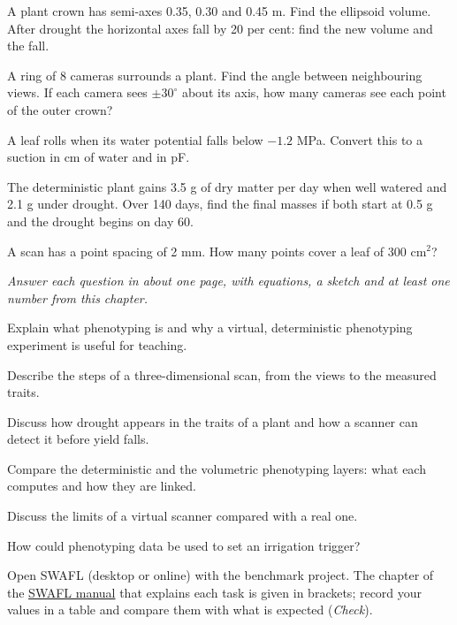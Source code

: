 \begin{exlist}
\item A plant crown has semi-axes 0.35, 0.30 and 0.45 m. Find the ellipsoid volume. After drought the horizontal axes fall by 20 per cent: find the new volume and the fall.
\item A ring of 8 cameras surrounds a plant. Find the angle between neighbouring views. If each camera sees $\pm30^\circ$ about its axis, how many cameras see each point of the outer crown?
\item A leaf rolls when its water potential falls below $-1.2$ MPa. Convert this to a suction in cm of water and in pF.
\item The deterministic plant gains 3.5 g of dry matter per day when well watered and 2.1 g under drought. Over 140 days, find the final masses if both start at 0.5 g and the drought begins on day 60.
\item A scan has a point spacing of 2 mm. How many points cover a leaf of 300 cm$^2$?
\end{exlist}
{\small\itshape Answer each question in about one page, with equations, a sketch and at least one number from this chapter.}\par\vspace{3pt}
\begin{exlist}
\item Explain what phenotyping is and why a virtual, deterministic phenotyping experiment is useful for teaching.
\item Describe the steps of a three-dimensional scan, from the views to the measured traits.
\item Discuss how drought appears in the traits of a plant and how a scanner can detect it before yield falls.
\item Compare the deterministic and the volumetric phenotyping layers: what each computes and how they are linked.
\item Discuss the limits of a virtual scanner compared with a real one.
\item How could phenotyping data be used to set an irrigation trigger?
\end{exlist}
{\small Open SWAFL (desktop or online) with the benchmark project. The chapter of the \href{https://github.com/halilunaziru73-creator/Coupled-Water-Fluxes-Pore-Scale-Dynamics-Precision-Irrigation-Mulching-Feedback-Loops/raw/main/Software/v1.1.0/SWAFL_Desktop/docs/manual_v1.1.0/SWAFL_Manual_v1.1.0.pdf}{SWAFL manual} that explains each task is given in brackets; record your values in a table and compare them with what is expected (\emph{Check}).}\par\vspace{3pt}
